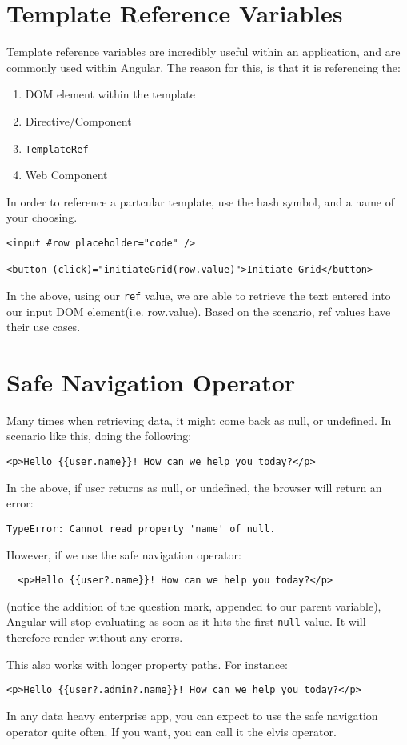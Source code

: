 \section{ Template Reference Variables }
Template reference variables are incredibly useful within an application, and 
are commonly used within Angular. The reason for this, is that it is 
referencing the:
\begin{enumerate}
  \item DOM element within the template
  \item Directive/Component
  \item \lstinline{TemplateRef}
  \item Web Component
\end{enumerate}

In order to reference a partcular template, use the hash symbol, and a name of 
your choosing. 

\begin{lstlisting}
<input #row placeholder="code" />  

<button (click)="initiateGrid(row.value)">Initiate Grid</button>
\end{lstlisting}

In the above, using our \lstinline{ref} value, we are able to retrieve the 
text entered into our input DOM element(i.e. row.value). Based on the scenario, 
ref values have their use cases. 

\section{ Safe Navigation Operator }
Many times when retrieving data, it might come back as null, or undefined. In
scenario like this, doing the following: 
\begin{lstlisting}
<p>Hello {{user.name}}! How can we help you today?</p>  
\end{lstlisting}

In the above, if user returns as null, or undefined, the browser will return 
an error: 
\begin{lstlisting}
TypeError: Cannot read property 'name' of null.  
\end{lstlisting}

However, if we use the safe navigation operator: 
\begin{lstlisting}
  <p>Hello {{user?.name}}! How can we help you today?</p>  
\end{lstlisting}

(notice the addition of the question mark, appended to our parent variable), 
Angular will stop evaluating as soon as it hits the first \lstinline{null}
value. It will therefore render without any erorrs.

This also works with longer property paths. For instance: 
\begin{lstlisting}
<p>Hello {{user?.admin?.name}}! How can we help you today?</p>    
\end{lstlisting}

In any data heavy enterprise app, you can expect to use the safe navigation
operator quite often. If you want, you can call it the elvis operator. 
